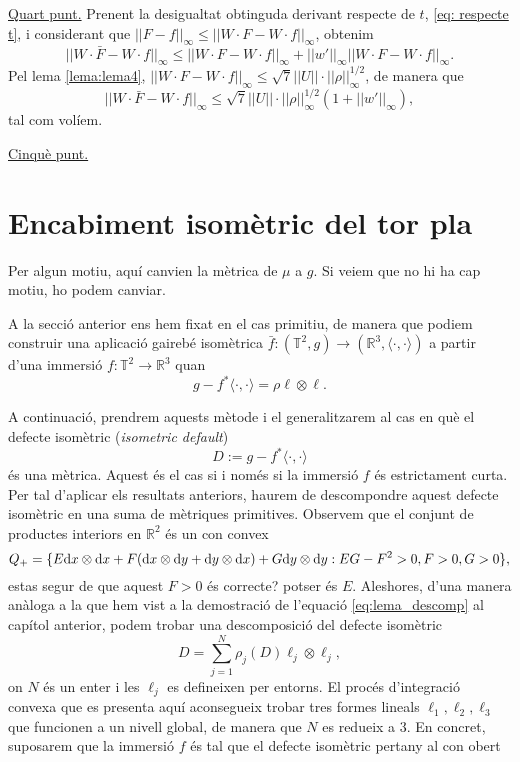 {\underline{Quart punt.}
Prenent la desigualtat obtinguda derivant respecte de $t$, \ref{eq: respecte t}, i considerant que $||F-f||_\infty\le||W\cdot F - W\cdot f||_\infty$, obtenim
\begin{equation*}
    ||W\cdot\bar F - W\cdot f||_\infty\le ||W\cdot F - W\cdot f||_\infty + ||w'||_\infty||W\cdot F - W\cdot f||_\infty.
\end{equation*}
Pel lema \ref{lema:lema4}, $||W\cdot F - W\cdot f||_\infty\le\sqrt7||U||\cdot||\rho||^{1/2}_\infty$, de manera que
\begin{equation*}
    ||W\cdot\bar F - W\cdot f||_\infty\le\sqrt7||U||\cdot||\rho||^{1/2}_\infty(1+||w'||_\infty),
\end{equation*}
tal com volíem.

\underline{Cinquè punt.}

}
\section{Encabiment isomètric del tor pla}
{
\color{blue} Per algun motiu, aquí canvien la mètrica de $\mu$ a $g$. Si veiem que no hi ha cap motiu, ho podem canviar.
}

A la secció anterior ens hem fixat en el cas primitiu, de manera que podiem construir una aplicació gairebé isomètrica $\bar f:(\mathbb T^2, g)\to(\mathbb R^3, \langle\cdot, \cdot\rangle)$ a partir d'una immersió $f:\mathbb T^2\to\mathbb R^3$ quan
\begin{equation*}
    g - f^*\langle\cdot, \cdot\rangle = \rho\ell\otimes\ell.
\end{equation*}

A continuació, prendrem aquests mètode i el generalitzarem al cas en què el defecte isomètric (\textit{isometric default}) 
\begin{equation*}
    D:=g-f^*\langle\cdot, \cdot\rangle
\end{equation*}
és una mètrica. Aquest és el cas si i només si la immersió $f$ és estrictament curta. Per tal d'aplicar els resultats anteriors, haurem de descompondre aquest defecte isomètric en una suma de mètriques primitives. Observem que el conjunt de productes interiors en $\mathbb R^2$ és un con convex
\begin{equation*}
    Q_+ = \{E\text dx\otimes\text dx + F(\text dx\otimes\text dy + \text dy\otimes\text dx) + G\text dy\otimes\text dy : EG-F^2>0, F>0, G>0\},
\end{equation*}
{\color{blue} estas segur de que aquest $F>0$ és correcte? potser és $E$.}
Aleshores, d'una manera anàloga a la que hem vist a la demostració de l'equació \ref{eq:lema_descomp} al capítol anterior, podem trobar una descomposició del defecte isomètric
\begin{equation*}
    D = \sum_{j=1}^N \rho_j(D) \ell_j\otimes\ell_j,
\end{equation*}
on $N$ és un enter i les $\ell_j$ es defineixen per entorns. El procés d'integració convexa que es presenta aquí aconsegueix trobar tres formes lineals $\ell_1, \ell_2, \ell_3$ que funcionen a un nivell global, de manera que $N$ es redueix a $3$.
En concret, suposarem que la immersió $f$ és tal que el defecte isomètric pertany al con obert


